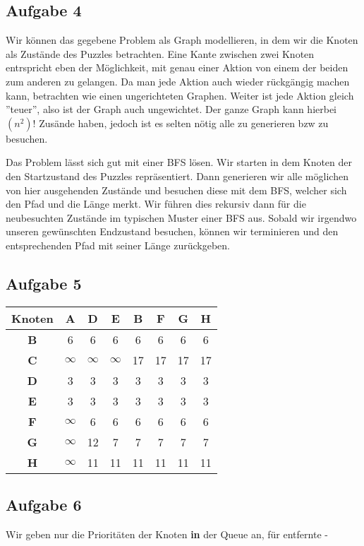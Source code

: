\documentclass[a4paper,graphics,11pt]{article}
\newcommand{\aufgabe}[1]{\subsection*{Aufgabe #1}}
\begin{document}
\newpage

\aufgabe{4}
Wir können das gegebene Problem als Graph modellieren, in dem wir die Knoten als Zustände des Puzzles betrachten. Eine Kante
zwischen zwei Knoten entrspricht eben der Möglichkeit, mit genau einer Aktion von einem der beiden zum anderen zu gelangen.
Da man jede Aktion auch wieder rückgängig machen kann, betrachten wie einen ungerichteten Graphen. Weiter ist jede Aktion
gleich ''teuer'', also ist der Graph auch ungewichtet. Der ganze Graph kann hierbei $(n^2)!$ Zusände haben, jedoch ist es selten
nötig alle zu generieren bzw zu besuchen.

Das Problem lässt sich gut mit einer BFS lösen. Wir starten in dem Knoten der den Startzustand des Puzzles repräsentiert.
Dann generieren wir alle möglichen von hier ausgehenden Zustände und besuchen diese mit dem BFS, welcher sich den Pfad und die
Länge merkt. Wir führen dies rekursiv dann für die neubesuchten Zustände im typischen Muster einer BFS aus. Sobald wir irgendwo unseren gewünschten Endzustand besuchen, können wir terminieren und den entsprechenden Pfad
mit seiner Länge zurückgeben.

\aufgabe{5}

\begin{tabular}{c|c|c|c|c|c|c|c}
    \textbf{Knoten} & A & D & E & B & F& G& H\\
    \hline
    \textbf{B} & 6 & 6 & 6 & 6 & 6 & 6 & 6\\
    \hline
    \textbf{C} & $\infty$ & $\infty$ & $\infty$ & 17 & 17 & 17 & 17\\
    \hline
    \textbf{D} & 3 & 3 & 3 & 3 & 3 & 3 & 3\\
    \hline
    \textbf{E} & 3 & 3 & 3 & 3 & 3 & 3 & 3\\
    \hline
    \textbf{F} & $\infty$ & 6 & 6 & 6 & 6 & 6 & 6\\
    \hline
    \textbf{G} & $\infty$ & 12 & 7 & 7 & 7 & 7 & 7\\
    \hline
    \textbf{H} & $\infty$ & 11 & 11 & 11 & 11 & 11 & 11\\
\end{tabular}

\aufgabe{6}

Wir geben nur die Prioritäten der Knoten \textbf{in} der Queue an, für entfernte -
\end{document}
